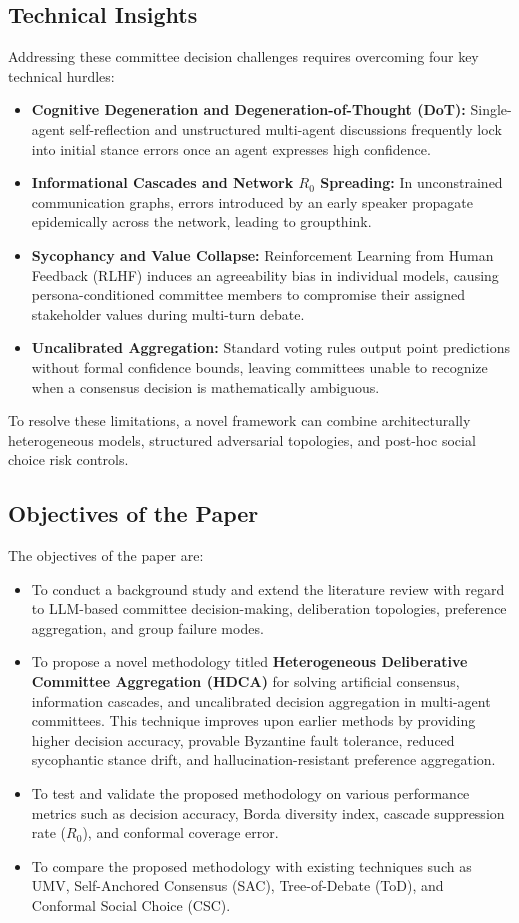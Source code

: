 \documentclass[a4paper,fleqn]{cas-sc}
\begin{document}
\subsection{Technical Insights}
Addressing these committee decision challenges requires overcoming four key technical hurdles:
\begin{itemize}
    \item \textbf{Cognitive Degeneration and Degeneration-of-Thought (DoT):} Single-agent self-reflection and unstructured multi-agent discussions frequently lock into initial stance errors once an agent expresses high confidence.
    \item \textbf{Informational Cascades and Network $R_0$ Spreading:} In unconstrained communication graphs, errors introduced by an early speaker propagate epidemically across the network, leading to groupthink.
    \item \textbf{Sycophancy and Value Collapse:} Reinforcement Learning from Human Feedback (RLHF) induces an agreeability bias in individual models, causing persona-conditioned committee members to compromise their assigned stakeholder values during multi-turn debate.
    \item \textbf{Uncalibrated Aggregation:} Standard voting rules output point predictions without formal confidence bounds, leaving committees unable to recognize when a consensus decision is mathematically ambiguous.
\end{itemize}
To resolve these limitations, a novel framework can combine architecturally heterogeneous models, structured adversarial topologies, and post-hoc social choice risk controls.

\subsection{Objectives of the Paper}
The objectives of the paper are:
\begin{itemize}
    \item To conduct a background study and extend the literature review with regard to LLM-based committee decision-making, deliberation topologies, preference aggregation, and group failure modes.
    \item To propose a novel methodology titled \textbf{Heterogeneous Deliberative Committee Aggregation (HDCA)} for solving artificial consensus, information cascades, and uncalibrated decision aggregation in multi-agent committees. This technique improves upon earlier methods by providing higher decision accuracy, provable Byzantine fault tolerance, reduced sycophantic stance drift, and hallucination-resistant preference aggregation.
    \item To test and validate the proposed methodology on various performance metrics such as decision accuracy, Borda diversity index, cascade suppression rate ($R_0$), and conformal coverage error.
    \item To compare the proposed methodology with existing techniques such as UMV, Self-Anchored Consensus (SAC), Tree-of-Debate (ToD), and Conformal Social Choice (CSC).
\end{itemize}
\end{document}
